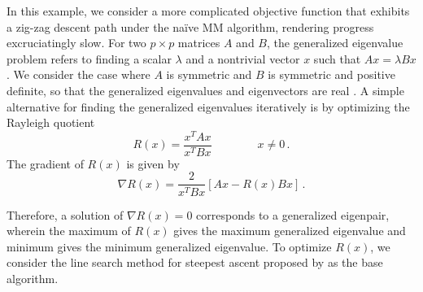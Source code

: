 \documentclass{statsoc}
\begin{document}
In this example, we consider a more complicated objective function that exhibits a zig-zag descent path under the na\"ive MM algorithm, rendering progress excruciatingly slow. For two $p \times p$ matrices $A$ and $B$, the generalized eigenvalue problem refers to finding a scalar $\lambda$ and a nontrivial vector $x$ such that $Ax = \lambda Bx$. We consider the case where $A$ is symmetric and $B$ is symmetric and positive definite, so that the generalized eigenvalues and eigenvectors are real %
\citep{zhou2011quasi}. A simple alternative for finding the generalized eigenvalues iteratively is by optimizing the Rayleigh quotient 
\[
R(x) = \dfrac{x^T A x}{x^T B x} \qquad \qquad x \neq 0\,.
\]
The gradient of $R(x)$ is given by
\[
\nabla R(x) = \dfrac{2}{x^T B x}[Ax - R(x)Bx]\,.
\]

Therefore, a solution of $\nabla R(x)=0$ corresponds to a generalized eigenpair, wherein the maximum of $R(x)$ gives the maximum generalized eigenvalue and minimum gives the minimum generalized eigenvalue. %
To optimize $R(x)$, we consider the line search method for steepest ascent proposed by \cite{hestenes1951solutions} as the base algorithm.
\end{document}
